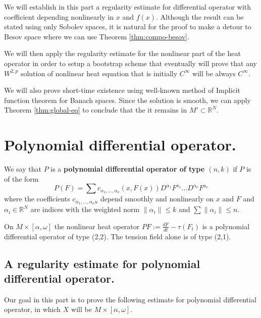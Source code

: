 
We will establish in this part a regularity estimate for differential
operator with coefficient depending nonlinearly in \(x\) and \(f(x)\). Although the
result can be stated using only Sobolev spaces, it is natural for the proof to make a
detour to Besov space where we can use Theorem \ref{thm:compo-besov}.

We will then apply the regularity estimate for the nonlinear part of the heat operator in
order to setup a bootstrap scheme that eventually will prove that any \(W^{2,p}\)
solution of nonlinear heat equation that is initially \(C^\infty\) will be always \(C^\infty\). 

We will also prove short-time existence using well-known method of Implicit
function theorem for Banach spaces. Since the solution is smooth, we can apply Theorem
\ref{thm:global-eq} to conclude that the it remains in \(M'\subset \mathbb{R}^N\).

\section{Polynomial differential operator.}
\label{sec:org0744758}

\begin{definition}
We say that \(P\) is a \textbf{polynomial differential operator of type \((n,k)\)} if \(P\)
is of the form
\[
 P(F) = \sum c_{\alpha_1,\dots, \alpha_\nu} (x, F(x)) D^{\alpha_1} F^{a_1} \dots D^{\alpha_\nu} F^{a_{\nu}}
\]
where the coefficients \(c_{\alpha_1,\dots,\alpha_nu}\) depend smoothly and nonlinearly on \(x\) and \(F\) and \(\alpha_i\in \mathbb{R}^N\) are indices with the weighted norm \(\|\alpha_i\| \leq k\) and \(\sum \|\alpha_i\| \leq n\).
\end{definition}

\begin{exampl}
On \(M\times [\alpha,\omega]\) the nonlinear heat operator \(P F := \frac{d F}{dt} -
\tau (F_t)\) is a polynomial differential operator of type (2,2). The tension field alone
is of type (2,1).
\end{exampl}

\subsection{A regularity estimate for polynomial differential operator.}
\label{sec:org59b4c4d}
Our goal in this part is to prove the following estimate for polynomial differential
operator, in which \(X\) will be \(M\times[\alpha,\omega]\).

